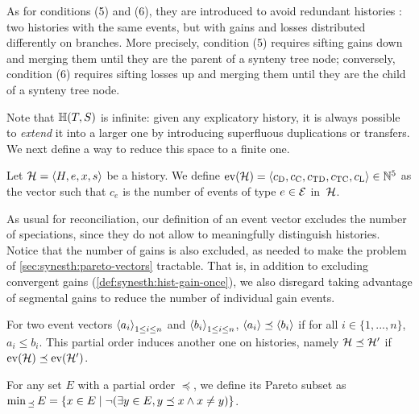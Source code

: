 As for conditions (5) and (6), they are introduced to avoid redundant histories : two histories with the same events, but with gains and losses distributed differently on branches. More precisely, condition (5) requires sifting gains down and merging them until they are the parent of a synteny tree node; conversely, condition (6) requires sifting losses up and merging them until they are the child of a synteny tree node.

Note that \(\mathbb{H}(T, S)\) is infinite: given any explicatory history, it is always possible to \emph{extend} it into a larger one by introducing superfluous duplications or transfers.
We next define a way to reduce this space to a finite one.

\begin{definition}
    Let \(\mathcal{H} = \left\langle H, e, x, s\right\rangle\) be a history.
    We define \(\mathrm{ev}(\mathcal{H}) = \langle c_{\mathrm{D}},\allowbreak c_{\mathrm{C}},\allowbreak c_{\mathrm{TD}},\allowbreak c_{\mathrm{TC}},\allowbreak c_{\mathrm{L}}\rangle \in \mathbb{N}^5\) as the vector such that \(c_e\) is the number of events of type \(e \in \mathcal{E}\) in~\(\mathcal{H}\).
\end{definition}

As usual for reconciliation, our definition of an event vector excludes the number of speciations, since they do not allow to meaningfully distinguish histories.
Notice that the number of gains is also excluded, as needed to make the problem of \cref{sec:synesth:pareto-vectors} tractable.
That is, in addition to excluding convergent gains (\cref{def:synesth:hist-gain-once}), we also disregard taking advantage of segmental gains to reduce the number of individual gain events.

\begin{definition}
    For two event vectors \(\left\langle a_i\right\rangle_{1\leq i \leq n}\) and \(\left\langle b_i\right\rangle_{1\leq i \leq n}\), \(\left\langle a_i\right\rangle \preceq \left\langle b_i\right\rangle\) if for all \(i \in \{1, ..., n\}\), \(a_i \leq b_i\).
    This partial order induces another one on histories, namely \(\mathcal{H} \preceq \mathcal{H}'\) if \(\mathrm{ev}(\mathcal{H}) \preceq \mathrm{ev}(\mathcal{H}')\).
\end{definition}

\begin{definition}
    For any set \(E\) with a partial order \(\preceq\), we define its Pareto subset as \(
        \min{}_{\preceq}\,{E} = \{x \in E \mid \neg (\exists y \in E, y \preceq x \land x \neq y)\}
    \).
\end{definition}

